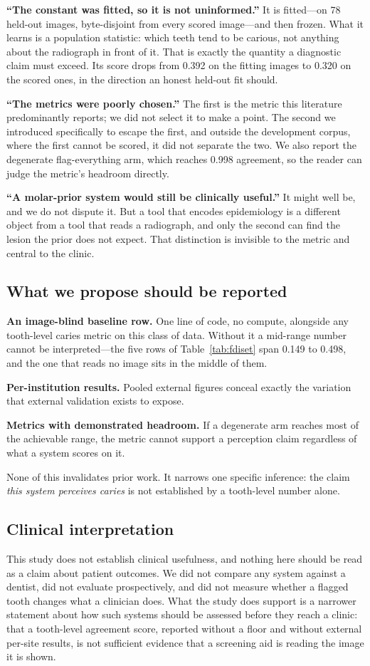 \documentclass[conference]{IEEEtran}
\begin{document}
\textbf{``The constant was fitted, so it is not uninformed.''} It is fitted---on
78 held-out images, byte-disjoint from every scored image---and then frozen. What
it learns is a population statistic: which teeth tend to be carious, not anything
about the radiograph in front of it. That is exactly the quantity a diagnostic
claim must exceed. Its score drops from 0.392 on the fitting images to 0.320 on
the scored ones, in the direction an honest held-out fit should.

\textbf{``The metrics were poorly chosen.''} The first is the metric this
literature predominantly reports; we did not select it to make a point. The
second we introduced specifically to escape the first, and outside the
development corpus, where the first cannot be scored, it did not separate the two. We also report the degenerate
flag-everything arm, which reaches 0.998 agreement, so the reader can judge the
metric's headroom directly.

\textbf{``A molar-prior system would still be clinically useful.''} It might well
be, and we do not dispute it. But a tool that encodes epidemiology is a different
object from a tool that reads a radiograph, and only the second can find the
lesion the prior does not expect. That distinction is invisible to the metric and
central to the clinic.

\subsection{What we propose should be reported}
\textbf{An image-blind baseline row.} One line of code, no compute, alongside any
tooth-level caries metric on this class of data. Without it a mid-range number
cannot be interpreted---the five rows of Table~\ref{tab:fdiset} span 0.149 to
0.498, and the one that reads no image sits in the middle of them.

\textbf{Per-institution results.} Pooled external figures conceal exactly the
variation that external validation exists to expose.

\textbf{Metrics with demonstrated headroom.} If a degenerate arm reaches most of
the achievable range, the metric cannot support a perception claim regardless of
what a system scores on it.

None of this invalidates prior work. It narrows one specific inference: the claim
\emph{this system perceives caries} is not established by a tooth-level number
alone.

\subsection{Clinical interpretation}
This study does not establish clinical usefulness, and nothing here should be
read as a claim about patient outcomes. We did not compare any system against a
dentist, did not evaluate prospectively, and did not measure whether a flagged
tooth changes what a clinician does. What the study does support is a narrower
statement about how such systems should be assessed before they reach a clinic:
that a tooth-level agreement score, reported without a floor and without external
per-site results, is not sufficient evidence that a screening aid is reading the
image it is shown.
\end{document}

